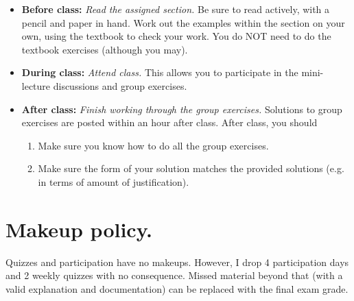 \documentclass[letterpaper]{inzane_syllabus} %
\begin{document}
\begin{itemize}
	\item \textbf{Before class:} \textit{Read the assigned section.} Be sure to read \alert{actively}, with a pencil and paper in hand.  Work out the examples within the section on your own, using the textbook to check your work.  You do NOT need to do the textbook exercises (although you may).
	\item \textbf{During class:} \textit{Attend class.} This allows you to participate in the mini-lecture discussions and group exercises.
	\item \textbf{After class:} \textit{Finish working through the group exercises.}   Solutions to group exercises are posted within an hour after class.  After class, you should 
	\begin{enumerate}
	\item Make sure you know how to do \alert{all} the group exercises. 
	\item Make sure the \alert{form} of your solution matches the provided solutions (e.g. in terms of amount of justification).    
	\end{enumerate}	
\end{itemize}	


\vspace{0.25cm}
\section{Makeup policy.} Quizzes and participation have no makeups. However, I drop 4 participation days and 2 weekly quizzes with no consequence. Missed material beyond that (with a valid explanation and documentation) can be replaced with the final exam grade.

\vspace{0.25cm}
%
%
%
\end{document}

